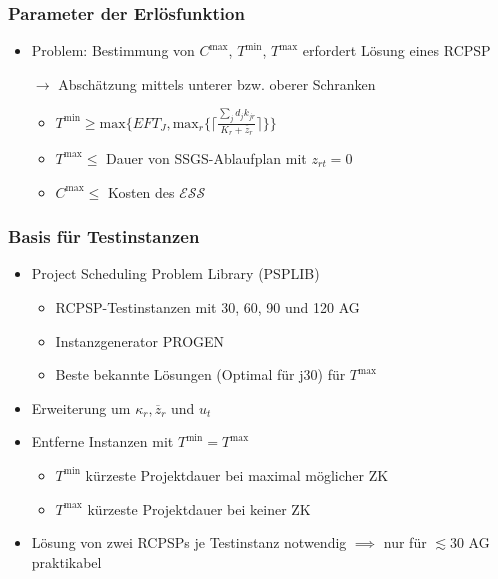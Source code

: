 \begin{frame}
\frametitle{Parameter der Erlösfunktion}
\begin{itemize}
\item Problem: Bestimmung von $C^{\mbox{max}}$, $T^{\mbox{min}}$, $T^{\mbox{max}}$ erfordert Lösung eines RCPSP\\[5mm]
\item[$\rightarrow$]  Abschätzung mittels unterer bzw. oberer Schranken\\[2mm]
\begin{itemize}
\item $T^{\mbox{min}} \geq \mbox{max}\{EFT_{J},\mbox{max}_{r}\{\lceil\frac{\sum_{j}d_{j}k_{jr}}{K_{r}+\overline{z}_{r}}\rceil\}\}$\\[1mm]
\item $T^{\mbox{max}} \leq$ Dauer von SSGS-Ablaufplan mit $z_{rt}=0$\\[4mm]
\item $C^{\mbox{max}} \leq $ Kosten des $\mathcal{ESS}$
\end{itemize}
\end{itemize}
\end{frame}

\begin{frame}
\frametitle{Basis für Testinstanzen}
\begin{itemize}
\item Project Scheduling Problem Library (PSPLIB)
	\begin{itemize}
		\item RCPSP-Testinstanzen mit 30, 60, 90 und 120 AG
		\item Instanzgenerator PROGEN
		\item Beste bekannte Lösungen (Optimal für j30) für $T^{\mbox{max}}$\\[4mm]
	\end{itemize}

\item Erweiterung um $\kappa_r, \overline{z}_r$ und $u_t$\\[4mm]

\item Entferne Instanzen mit $T^{\mbox{min}} = T^{\mbox{max}}$
	\begin{itemize}
	\item $T^{\mbox{min}}$ kürzeste Projektdauer bei maximal möglicher ZK
	\item $T^{\mbox{max}}$ kürzeste Projektdauer bei keiner ZK
	\end{itemize}
\item Lösung von zwei RCPSPs je Testinstanz notwendig $\implies$ nur für $\lesssim 30$ AG praktikabel
\end{itemize}

\end{frame}

